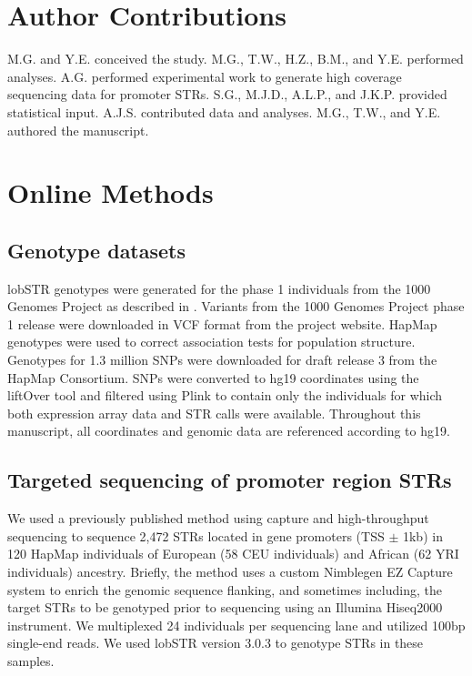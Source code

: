 \section{Author Contributions}
M.G. and Y.E. conceived the study. M.G., T.W., H.Z., B.M., and Y.E. performed analyses. A.G. performed experimental work to generate high coverage sequencing data for promoter STRs. S.G., M.J.D., A.L.P., and J.K.P. provided statistical input. A.J.S. contributed data and analyses. M.G., T.W., and Y.E. authored the manuscript.

\section{Online Methods}
\label{sec:estrolm}

\subsection{Genotype datasets}
lobSTR genotypes were generated for the phase 1 individuals from the 1000 Genomes Project as described in \cite{WillemsGymrekHighnamEtAl2014}. Variants from the 1000 Genomes Project phase 1 release were downloaded in VCF format from the project website. HapMap genotypes were used to correct association tests for population structure. Genotypes for 1.3 million SNPs were downloaded for draft release 3 from the HapMap Consortium. SNPs were converted to hg19 coordinates using the liftOver tool and filtered using Plink \cite{PurcellNealeTodd-BrownEtAl2007} to contain only the individuals for which both expression array data and STR calls were available. Throughout this manuscript, all coordinates and genomic data are referenced according to hg19.

\subsection{Targeted sequencing of promoter region STRs}
We used a previously published method using capture and high-throughput sequencing \cite{GuilmatreHighnamBorelEtAl2013} to sequence 2,472 STRs located in gene promoters (TSS $\pm$ 1kb) in 120 HapMap individuals of European (58 CEU individuals) and African (62 YRI individuals) ancestry. Briefly, the method uses a custom Nimblegen EZ Capture system to enrich the genomic sequence flanking, and sometimes including, the target STRs to be genotyped prior to sequencing using an Illumina Hiseq2000 instrument. We multiplexed 24 individuals per sequencing lane and utilized 100bp single-end reads. We used lobSTR version 3.0.3 to genotype STRs in these samples.


